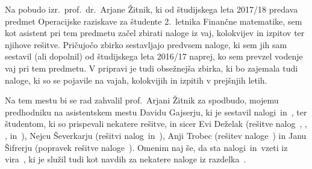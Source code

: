 Na pobudo izr.~prof.~dr.~Arjane Žitnik,
ki od študijskega leta 2017/18 predava predmet Operacijske raziskave
za študente 2.~letnika Finančne matematike,
sem kot asistent pri tem predmetu začel zbirati
naloge iz vaj, kolokvijev in izpitov ter njihove rešitve.
Pričujočo zbirko sestavljajo predvsem naloge,
ki sem jih sam sestavil (ali dopolnil) od študijskega leta 2016/17 naprej,
ko sem prevzel vodenje vaj pri tem predmetu.
V pripravi je tudi obsežnejša zbirka, ki bo zajemala tudi naloge,
ki so se pojavile na vajah, kolokvijih in izpitih v prejšnjih letih.

Na tem mestu bi se rad zahvalil prof.~Arjani Žitnik za spodbudo,
mojemu predhodniku na asistentskem mestu Davidu Gajserju,
ki je sestavil nalogi~\nal[brezzobec] in~\nal[palacinke],
ter študentom, ki so prispevali nekatere rešitve,
in sicer Evi Deželak
(rešitve nalog~\res[dectree3], \res[bfs], \res[dijkstra], \res[dfs] in~\res[pot]),
Nejcu Ševerkarju (rešitvi nalog~\res[topo] in~\res[dag]),
Anji Trobec (rešitev naloge~\res[konferenca])
in Janu Šifrerju (popravek rešitve naloge~\res[topo]).
Omenim naj še, da sta nalogi~\nal[blago] in~\nal[dfs] vzeti iz vira~\cite{dpv},
ki je služil tudi kot navdih za nekatere naloge iz razdelka~.
